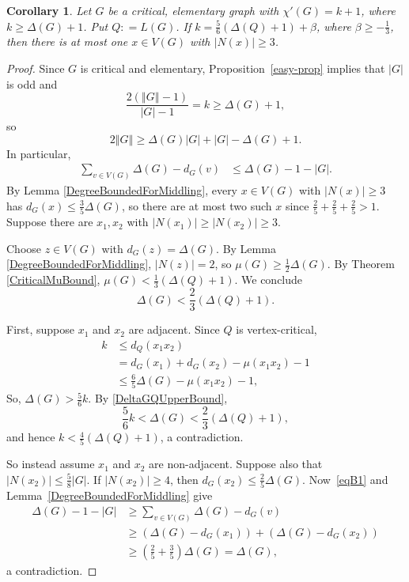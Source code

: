 \documentclass[12pt]{article}
\theoremstyle{plain}
\newtheorem{cor}[thm]{Corollary}
\theoremstyle{definition}
\theoremstyle{remark}
\newcommand{\card}[1]{\left|#1\right|}
\newcommand{\size}[1]{\left\Vert#1\right\Vert}
\newcommand{\parens}[1]{\left( #1 \right)}
\newcommand{\DefinedAs}{\mathrel{\mathop:}=}
\begin{document}
\begin{cor}
\label{CriticalElementary56}
Let $G$ be a critical, elementary graph with $\chi'(G) = k + 1$, where $k \ge
\Delta(G) + 1$.  Put $Q \DefinedAs L(G)$.  If $k = \frac56\parens{\Delta(Q) +
1} + \beta$, where $\beta \ge -\frac13$, then there is at most one $x \in V(G)$
with $\card{N(x)} \ge 3$.
\end{cor}
\begin{proof}
Since $G$ is critical and elementary, Proposition~\ref{easy-prop} implies that
$\card{G}$ is odd and
\[\frac{2(\size{G} - 1)}{\card{G} - 1} = k \ge \Delta(G) + 1,\]
so
\[2\size{G} \ge \Delta(G)\card{G} + \card{G} - \Delta(G) + 1.\]
In particular,
\begin{align}
\sum_{v \in V(G)} \Delta(G) - d_G(v) &\le \Delta(G) - 1 - \card{G}.
\label{eqB1}
\end{align}
By Lemma \ref{DegreeBoundedForMiddling}, every $x \in V(G)$ with $\card{N(x)} \ge 3$ has $d_G(x) \le \frac35\Delta(G)$, so there are at most two such $x$ since
$\frac25 + \frac25 + \frac25 > 1$.  Suppose there are $x_1, x_2$ with $\card{N(x_1)} \ge \card{N(x_2)} \ge 3$.

Choose $z \in V(G)$ with $d_G(z) = \Delta(G)$.  By Lemma
\ref{DegreeBoundedForMiddling}, $\card{N(z)} = 2$, so $\mu(G) \ge \frac12\Delta(G)$.
By Theorem \ref{CriticalMuBound}, $\mu(G) < \frac13(\Delta(Q) + 1)$.  We conclude
\begin{equation}
\Delta(G) < \frac23(\Delta(Q) + 1).\label{DeltaGQUpperBound}
\end{equation}

First, suppose $x_1$ and $x_2$ are adjacent.  Since $Q$ is vertex-critical, 
\begin{align*}
k &\le d_Q(x_1x_2)\\
&=d_G(x_1) + d_G(x_2) - \mu(x_1x_2) - 1\\
&\le \frac65\Delta(G) - \mu(x_1x_2) - 1,
\end{align*}
So, $\Delta(G) >\frac56k$.  By \eqref{DeltaGQUpperBound},
\[\frac56k < \Delta(G) < \frac23(\Delta(Q) + 1),\]
and hence $k < \frac45(\Delta(Q) + 1)$, a contradiction.  

So instead assume $x_1$ and $x_2$ are non-adjacent. Suppose also that
$\card{N(x_2)} \le \frac58\card{G}$.  If $\card{N(x_2)}\ge 4$, then 
$d_G(x_2)\le \frac25\Delta(G)$.
Now~\eqref{eqB1} and Lemma~\ref{DegreeBoundedForMiddling} give
\begin{align*}
\Delta(G)-1-\card{G}&\ge \sum_{v\in V(G)}\Delta(G)-d_G(v)\\
&\ge (\Delta(G)-d_G(x_1))+(\Delta(G)-d_G(x_2))\\
&\ge \left(\frac25+\frac35\right)\Delta(G)=\Delta(G),
\end{align*}
a contradiction.


\end{proof}
\end{document}
